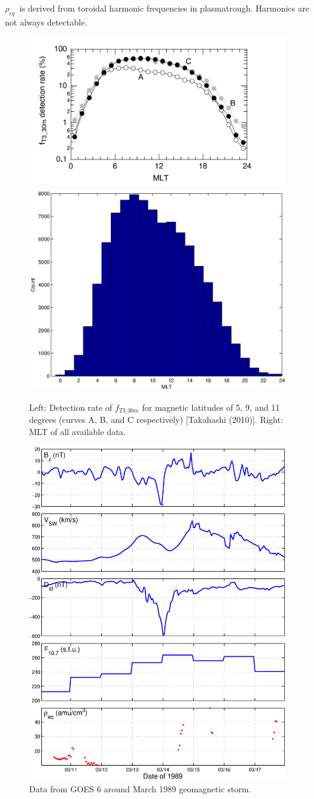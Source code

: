 \documentclass[xcolor={dvipsnames,table}]{beamer}
\newcommand{\req}{\ensuremath{\rho_{eq}}} %
\begin{document}
\begin{frame}
	\req\ is derived from toroidal harmonic frequencies in plasmatrough. Harmonics are not always detectable.
	\begin{figure}[htp!]
		\centering
		\includegraphics[width=0.4\linewidth]{Figures/Takahashi2010Availability.png}
		\includegraphics[width=0.4\linewidth]{Figures/databyMLT}
		\caption{Left: Detection rate of $f_{T3\_30m}$ for magnetic latitudes of 5, 9, and 11 degrees (curves A, B, and C respectively) [Takahashi (2010)]. Right: MLT of all available data.}
		\label{fig:Takahashi2010Availability}
	\end{figure}
\end{frame}

\begin{frame}
\begin{figure}[htp!]
	\centering
	\includegraphics[width=0.5\linewidth]{Figures/alldata-GOES6-10Mar1989-17Mar1989.eps}%
	\caption{Data from GOES 6 around March 1989 geomagnetic storm.}
	\label{fig:alldata-GOES6-1989-1989}
\end{figure}
\end{frame}
\end{document}
